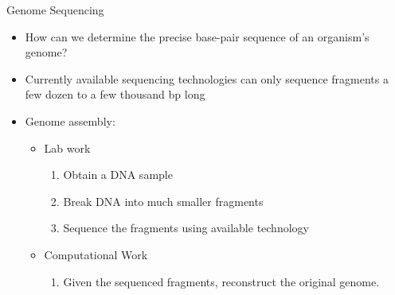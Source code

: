 \documentclass[xcolor=dvipsnames]{beamer}
\begin{document}
\begin{frame}{Genome Sequencing}
	\begin{itemize}
		\item How can we determine the precise base-pair sequence of an
		organism's genome?

		\item Currently available sequencing technologies can only sequence
		fragments a few dozen to a few thousand bp long

		\item Genome assembly:
			\begin{itemize}
				\item Lab work
				\begin{enumerate}[1.]
						\item Obtain a DNA sample
						\item Break DNA into much smaller fragments
						\item Sequence the fragments using available technology
				\end{enumerate}
				\item Computational Work
				\begin{enumerate}[4.]
					\item Given the sequenced fragments, reconstruct the original genome.
				\end{enumerate}
			\end{itemize}
	\end{itemize}
\end{frame}
\end{document}
